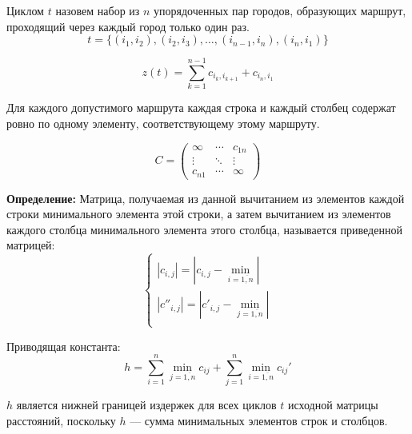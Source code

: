 \documentclass[17pt]{extarticle}
\begin{document}
\begin{definition}
    Циклом \( t \) назовем набор из \( n \) упорядоченных пар городов, образующих маршрут, проходящий через каждый город только один раз.
    \[
        t = \{(i_1, i_2), (i_2, i_3), \ldots, (i_{n-1}, i_n), (i_n, i_1)\}
    \]

    \[
        z(t) = \sum_{k=1}^{n-1} c_{i_k, i_{k+1}} + c_{i_n, i_1}
    \]

    Для каждого допустимого маршрута каждая строка и каждый столбец содержат ровно по одному элементу, соответствующему этому маршруту.

    \[
        C =
        \begin{pmatrix}
            \infty & \cdots & c_{1n} \\
            \vdots & \ddots & \vdots \\
            c_{n1} & \cdots & \infty
        \end{pmatrix}
    \]
\end{definition}
\begin{definition}
    \textbf{Определение:} Матрица, получаемая из данной вычитанием из элементов каждой строки минимального элемента этой строки,
    а затем вычитанием из элементов каждого столбца минимального элемента этого столбца, называется приведенной матрицей:
    \[
        \begin{cases}
            \left|c_{i,j}\right| = \left| c_{i,j} - \mathop{\min{c_{i,j}}} \limits_{i=\overline{1,n}} \right|     \\
            \left|c''_{i,j}\right| = \left| c'_{i,j} - \mathop{\min{c'_{i,j}}} \limits_{j=\overline{1,n}} \right| \\
        \end{cases}
    \]

    Приводящая константа:
    \[
        h = \sum_{i=1}^{n} \min_{j=\overline{1,n}} c_{ij} + \sum_{j=1}^{n} \min_{i=\overline{1,n}} c_{ij}'
    \]
\end{definition}
\( h \) является нижней границей издержек для всех циклов \( t \) исходной матрицы расстояний, поскольку \( h \) — сумма минимальных элементов строк и столбцов.
\end{document}
